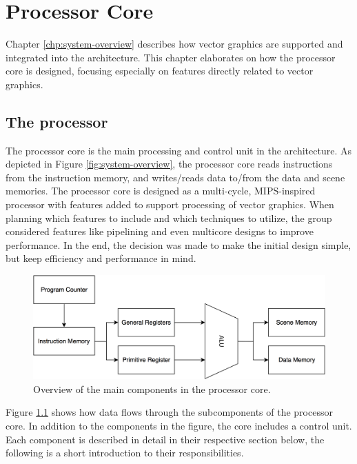 \chapter{Processor Core}

Chapter \ref{chp:system-overview} describes how vector graphics are supported and integrated into the \vthreek architecture.
This chapter elaborates on how the processor core is designed, focusing especially on features directly related to vector graphics.

\section{The \vthreek processor}

The processor core is the main processing and control unit in the \vthreek architecture.
As depicted in Figure \ref{fig:system-overview}, the processor core reads instructions from the instruction memory, and writes/reads data to/from the data and scene memories.
The processor core is designed as a multi-cycle, MIPS-inspired processor with features added to support processing of vector graphics.
When planning which features to include and which techniques to utilize, the group considered features like pipelining and even multicore designs to improve performance.
In the end, the decision was made to make the initial design simple, but keep efficiency and performance in mind.

\begin{figure}[H]
    \includegraphics[width=\linewidth]{images/core-components.png}
    \caption{Overview of the main components in the processor core.}
    \label{fig:core-components}
\end{figure}

Figure \ref{fig:core-components} shows how data flows through the subcomponents of the processor core.
In addition to the components in the figure, the core includes a control unit.
Each component is described in detail in their respective section below, the following is a short introduction to their responsibilities.

